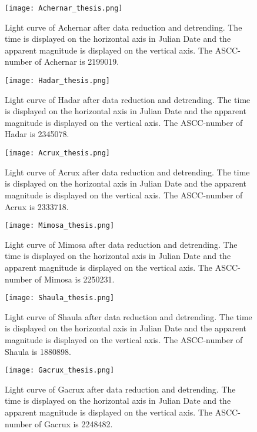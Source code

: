 \documentclass{aa}
\begin{document}
\begin{enumerate}
\begin{figure}
    \centering
    \texttt{[image: Achernar\_thesis.png]}
    \caption{Light curve of Achernar after data reduction and detrending. The time is displayed on the horizontal axis in Julian Date and the apparent magnitude is displayed on the vertical axis. The ASCC-number of Achernar is 2199019.}
    \label{Achernar}
\end{figure}

\begin{figure}
    \centering
    \texttt{[image: Hadar\_thesis.png]}
    \caption{Light curve of Hadar after data reduction and detrending. The time is displayed on the horizontal axis in Julian Date and the apparent magnitude is displayed on the vertical axis. The ASCC-number of Hadar is 2345078.}
    \label{Hadar}
\end{figure}

\begin{figure}
    \centering
    \texttt{[image: Acrux\_thesis.png]}
    \caption{Light curve of Acrux after data reduction and detrending. The time is displayed on the horizontal axis in Julian Date and the apparent magnitude is displayed on the vertical axis. The ASCC-number of Acrux is 2333718.}
    \label{Acrux}
\end{figure}

\begin{figure}
    \centering
    \texttt{[image: Mimosa\_thesis.png]}
    \caption{Light curve of Mimosa after data reduction and detrending. The time is displayed on the horizontal axis in Julian Date and the apparent magnitude is displayed on the vertical axis. The ASCC-number of Mimosa is 2250231.}
    \label{Mimosa}
\end{figure}

\begin{figure}
    \centering
    \texttt{[image: Shaula\_thesis.png]}
    \caption{Light curve of Shaula after data reduction and detrending. The time is displayed on the horizontal axis in Julian Date and the apparent magnitude is displayed on the vertical axis. The ASCC-number of Shaula is 1880898.}
    \label{Shaula}
\end{figure}

\begin{figure}
    \centering
    \texttt{[image: Gacrux\_thesis.png]}
    \caption{Light curve of Gacrux after data reduction and detrending. The time is displayed on the horizontal axis in Julian Date and the apparent magnitude is displayed on the vertical axis. The ASCC-number of Gacrux is 2248482.}
    \label{Gacrux}
\end{figure}


\end{enumerate}
\end{document}
